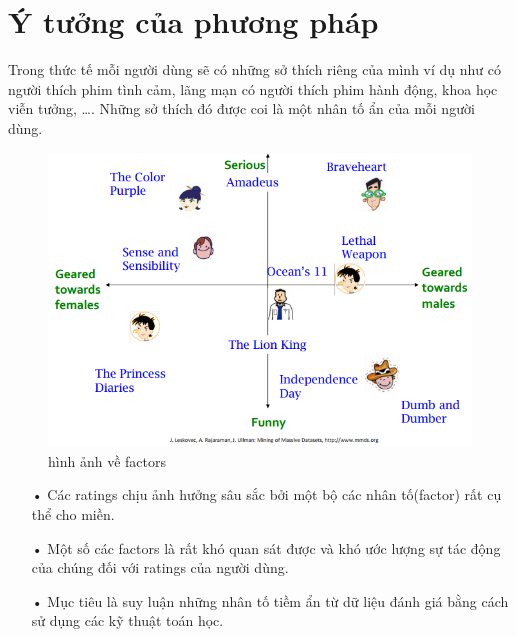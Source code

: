 \documentclass[a4paper,11pt]{report}
\begin{document}
\section{Ý tưởng của phương pháp}
Trong thức tế mỗi người dùng sẽ có những sở thích riêng của mình ví dụ như có người thích phim tình cảm, lãng mạn có người thích phim hành động, khoa học viễn tưởng, \ldots . Những sở thích đó được coi là một nhân tố ẩn của mỗi người dùng.
\begin{figure}[h]
\begin{center}
\includegraphics[scale=0.6]{LF.png}
\caption{hình ảnh về factors}
\end{center}
\end{figure}
\begin{itemize}
\item[•] Các ratings chịu ảnh hưởng sâu sắc bởi một bộ các nhân tố(factor) rất cụ thể cho miền.
\item[•] Một số các factors là rất khó quan sát được và khó ước lượng sự tác động của chúng đối với ratings của người dùng.
\item[•] Mục tiêu là suy luận những nhân tố tiềm ẩn từ dữ liệu đánh giá bằng cách sử dụng các kỹ thuật toán học.
\end{itemize}
\end{document}
